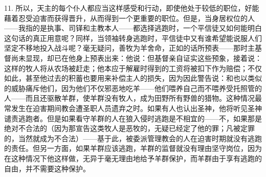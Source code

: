11. 所以，天主的每个仆人都应当这样感受和行动，即使他处于较低的职位，好能藉着忍受迫害而获得晋升，从而得到一个更重要的职位。但是，当身居权位的人——我指的是执事、司铎和主教本人——都选择逃跑时，一个平信徒又如何能明白这句话的真正用意呢？同样，当领袖转身逃跑时，平信徒中又有谁希望能说服人们坚定不移地投入战斗呢？毫无疑问，善牧为羊舍命，正如的话所预表——那时主基督尚未显现，却已在他身上预表出来：他说：但基督亲自证实这些预象，接着说：这样的牧人将从农场被赶走；他本应于解雇时得到的工资将被扣下作为赔偿；不仅如此，甚至他过去的积蓄也要用来补偿主人的损失，因为因此警告说：和也以类似的威胁痛斥他们，因为他们不仅邪恶地吃羊——他们喂养自己而不喂养受托照管的人——而且还驱散羊群，使羊群没有牧人，成为田野所有野兽的猎物。这种情况最常发生在迫害期间教会遭圣职人员遗弃之时。如果有人也认出圣神，他将听见圣神谴责逃跑者。但是如果看守羊群的人在狼入侵时逃跑是不相宜的——不，如果那是绝对不合法的（因为那宣告这类牧人是恶牧的，无疑已经定了他的罪；凡被定罪的，当然就成为不合法）——基于此，被委派管理教会的人在迫害时期就没有逃跑的责任。但另一方面，如果羊群应该逃跑，羊群的监督就没有理由坚守岗位，因为在这种情况下他这样做，无异于毫无理由地给予羊群保护，而羊群由于享有逃跑的自由，并不需要这种保护。\par

